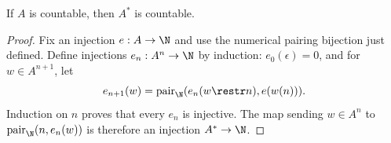 \begin{lemma}
If \(A\) is countable, then \(A^*\) is countable.
\end{lemma}
\begin{proof}
Fix an injection \(e:A\to\N\) and use the numerical pairing bijection just
defined.  Define injections
\(e_n:A^n\to\N\) by induction: \(e_0(\epsilon)=0\), and for
\(w\in A^{n+1}\), let
\[
  e_{n+1}(w)=\operatorname{pair}_{\N}(e_n(w\restr n),e(w(n))).
\]
Induction on \(n\) proves that every \(e_n\) is injective.  The map sending
\(w\in A^n\) to \(\operatorname{pair}_{\N}(n,e_n(w))\) is therefore an injection
\(A^*\to\N\).
\end{proof}

